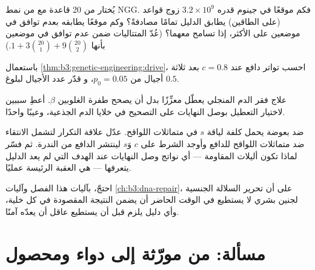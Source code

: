 \begin{exercise}[$\star\star$]\label{exo:b3:genetic-engineering:8}
يُختار  من 20 قاعدة مع  من نمط NGG. فكم موقعًا في
جينوم قدره $3.2\times 10^{9}$ زوج قواعد (على الطاقين) يطابق الدليل تمامًا
مصادفةً؟ وكم موقعًا يطابقه بعدم توافق في موضعين على الأكثر، إذا تسامح 
معهما؟ (عُدّ المتتاليات ضمن عدم توافق في موضعين بأنها $1 + 3\binom{20}{1} +
9\binom{20}{2}$.)
\end{exercise}

\begin{exercise}[$\star\star$]\label{exo:b3:genetic-engineering:9}
باستعمال \cref{thm:b3:genetic-engineering:drive}، احسب تواتر
دافع عند $c = 0.8$ بعد ثلاثة أجيال من $p_{0} = 0.05$، و
قدّر عدد الأجيال لبلوغ $0.5$.
\end{exercise}

\begin{exercise}[$\star\star\star$]\label{exo:b3:genetic-engineering:10}
علاج فقر الدم المنجلي يعطّل معزِّزًا بدل أن يصحح طفرة
الغلوبين $\beta$. أعطِ سببين لاختيار التعطيل بوصل النهايات
على التصحيح  في خلايا الدم الجذعية،
وعيبًا واحدًا.
\end{exercise}

\begin{exercise}[$\star\star\star$]\label{exo:b3:genetic-engineering:11}
 ضد بعوضة يحمل كلفة لياقة $s$ في
متماثلات اللواقح. عدّل علاقة التكرار لتشمل الانتقاء ضد متماثلات
اللواقح للدافع وأوجد الشرط على $c$ وَ$s$ لينتشر الدافع
من الندرة. ثم فسّر لماذا تكون أليلات المقاومة --- أي نواتج وصل
النهايات عند الهدف التي لم يعد الدليل يتعرفها --- هي
العقبة الرئيسة عمليًا.
\end{exercise}

\begin{exercise}[$\star\star\star$]\label{exo:b3:genetic-engineering:12}
احتجّ، بآليات هذا الفصل وآليات
\cref{ch:b3:dna-repair}، على أن تحرير السلالة الجنسية لجنين بشري لا
يستطيع في الوقت الحاضر أن يضمن النتيجة المقصودة في كل خلية، وأي
دليل يلزم قبل أن يستطيع عاقل أن يعدّه
آمنًا.
\end{exercise}

\section{مسألة: من مورّثة إلى دواء ومحصول}

